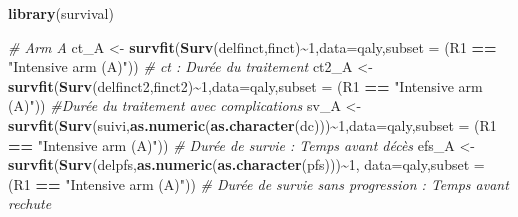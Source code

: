 \documentclass[
]{article}
\newenvironment{Shaded}{\begin{snugshade}}{\end{snugshade}}
\newcommand{\AttributeTok}[1]{\textcolor[rgb]{0.13,0.29,0.53}{#1}}
\newcommand{\CommentTok}[1]{\textcolor[rgb]{0.56,0.35,0.01}{\textit{#1}}}
\newcommand{\DecValTok}[1]{\textcolor[rgb]{0.00,0.00,0.81}{#1}}
\newcommand{\FunctionTok}[1]{\textcolor[rgb]{0.13,0.29,0.53}{\textbf{#1}}}
\newcommand{\NormalTok}[1]{#1}
\newcommand{\OtherTok}[1]{\textcolor[rgb]{0.56,0.35,0.01}{#1}}
\newcommand{\SpecialCharTok}[1]{\textcolor[rgb]{0.81,0.36,0.00}{\textbf{#1}}}
\newcommand{\StringTok}[1]{\textcolor[rgb]{0.31,0.60,0.02}{#1}}
\begin{document}
\begin{Shaded}
\begin{Highlighting}[]
\FunctionTok{library}\NormalTok{(survival)}

\CommentTok{\# Arm A}
\NormalTok{ct\_A  }\OtherTok{\textless{}{-}} \FunctionTok{survfit}\NormalTok{(}\FunctionTok{Surv}\NormalTok{(delfinct,finct)}\SpecialCharTok{\textasciitilde{}}\DecValTok{1}\NormalTok{,}\AttributeTok{data=}\NormalTok{qaly,}\AttributeTok{subset =}\NormalTok{ (R1 }\SpecialCharTok{==} \StringTok{"Intensive arm (A)"}\NormalTok{)) }\CommentTok{\# ct : Durée du traitement}
\NormalTok{ct2\_A  }\OtherTok{\textless{}{-}} \FunctionTok{survfit}\NormalTok{(}\FunctionTok{Surv}\NormalTok{(delfinct2,finct2)}\SpecialCharTok{\textasciitilde{}}\DecValTok{1}\NormalTok{,}\AttributeTok{data=}\NormalTok{qaly,}\AttributeTok{subset =}\NormalTok{ (R1 }\SpecialCharTok{==} \StringTok{"Intensive arm (A)"}\NormalTok{)) }\CommentTok{\#Durée du traitement avec complications}
\NormalTok{sv\_A  }\OtherTok{\textless{}{-}} \FunctionTok{survfit}\NormalTok{(}\FunctionTok{Surv}\NormalTok{(suivi,}\FunctionTok{as.numeric}\NormalTok{(}\FunctionTok{as.character}\NormalTok{(dc)))}\SpecialCharTok{\textasciitilde{}}\DecValTok{1}\NormalTok{,}\AttributeTok{data=}\NormalTok{qaly,}\AttributeTok{subset =}\NormalTok{ (R1 }\SpecialCharTok{==} \StringTok{"Intensive arm (A)"}\NormalTok{)) }\CommentTok{\# Durée de survie : Temps avant décès}
\NormalTok{efs\_A }\OtherTok{\textless{}{-}} \FunctionTok{survfit}\NormalTok{(}\FunctionTok{Surv}\NormalTok{(delpfs,}\FunctionTok{as.numeric}\NormalTok{(}\FunctionTok{as.character}\NormalTok{(pfs)))}\SpecialCharTok{\textasciitilde{}}\DecValTok{1}\NormalTok{, }\AttributeTok{data=}\NormalTok{qaly,}\AttributeTok{subset =}\NormalTok{ (R1 }\SpecialCharTok{==} \StringTok{"Intensive arm (A)"}\NormalTok{)) }\CommentTok{\# Durée de survie sans progression : Temps avant rechute }


\end{Highlighting}
\end{Shaded}
\end{document}
